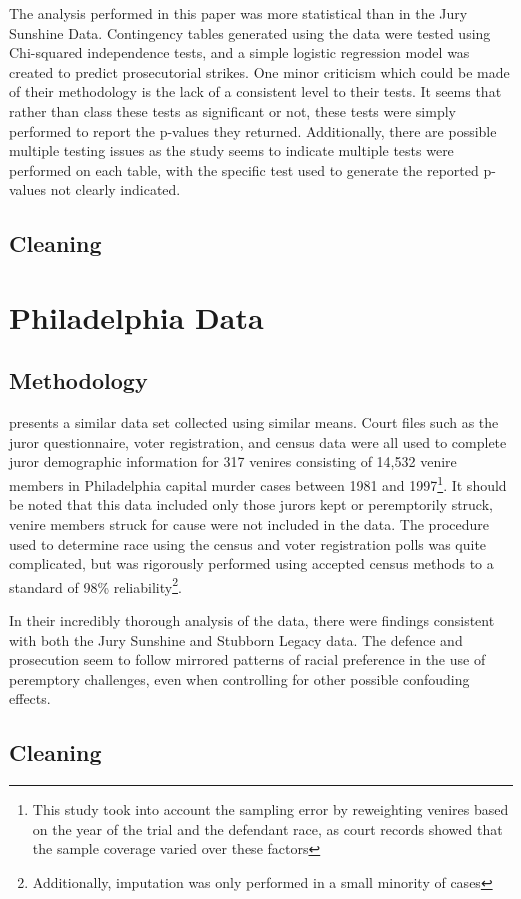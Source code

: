 The analysis performed in this paper was more statistical than in the Jury Sunshine Data. Contingency tables generated using the
data were tested using Chi-squared independence tests, and a simple logistic regression model was created to predict prosecutorial
strikes. One minor criticism which could be made of their methodology is the lack of a consistent level to their tests. It seems
that rather than class these tests as significant or not, these tests were simply performed to report the p-values they
returned. Additionally, there are possible multiple testing issues as the study seems to indicate multiple tests were performed on
each table, with the specific test used to generate the reported p-values not clearly indicated.

\subsection{Cleaning}

\section{Philadelphia Data} \label{sec:phillydata}

\subsection{Methodology}

\cite{PerempChalMurder} presents a similar data set collected using similar means. Court files such as the juror questionnaire,
voter registration, and census data were all used to complete juror demographic information for 317 venires consisting of 14,532
venire members in Philadelphia capital murder cases between 1981 and 1997\footnote{This study took into account the sampling error
  by reweighting venires based on the  year of the trial and the defendant race, as court records showed that the sample coverage
  varied over these factors}. It should be noted that this data included only those jurors kept or peremptorily struck, venire
members struck for cause were not included in the data. The procedure used to determine race using the census and voter registration polls was quite
complicated, but was rigorously performed using accepted census methods to a standard of 98\% reliability\footnote{Additionally,
  imputation was only performed in a small minority of cases}.

In their incredibly thorough analysis of the data, there were findings consistent with both the Jury Sunshine and Stubborn Legacy
data. The defence and prosecution seem to follow mirrored patterns of racial preference in the use of peremptory challenges, even
when controlling for other possible confouding effects.

\subsection{Cleaning}